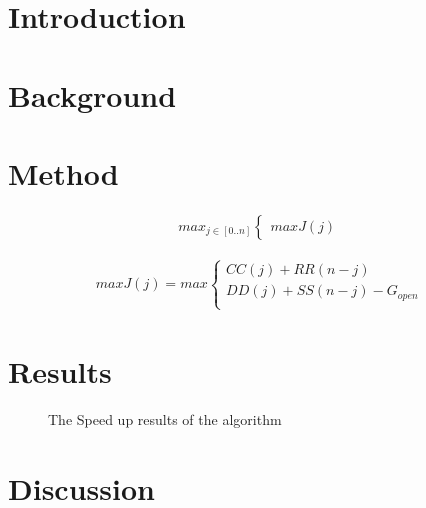 \section{Introduction}

\section{Background}

\section{Method}
  

\begin{align}
\label{MM}
	max_{j\in [0..n]}
 \begin{cases}
	 maxJ(j)
 \end{cases}
\end{align}

\begin{align}
\label{MM_2}
	maxJ(j) = max
 \begin{cases}
	 CC(j) + RR(n-j) \\
	 DD(j) + SS(n-j) - G_{open} \\
 \end{cases}
\end{align}




\section{Results}
\begin{figure}[H]
    \centering
    \caption{The Speed up results of the algorithm\cite{cuda2}}
    \label{fig:cuda2_stages}
\end{figure}

\section{Discussion}



